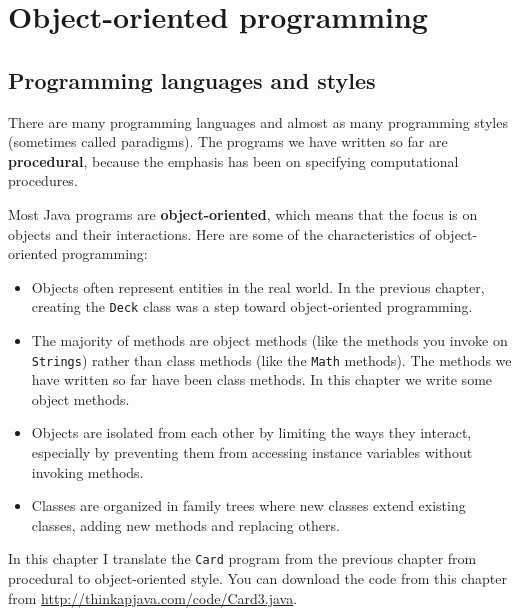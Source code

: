\chapter{Object-oriented programming}
\label{chap13}

\section{Programming languages and styles}

There are many programming languages and almost as many
programming styles (sometimes called paradigms).
The programs we have written so far are {\bf procedural},
because the emphasis has been on specifying computational procedures.

Most Java programs are {\bf object-oriented}, which means that
the focus is on objects and their interactions.
Here are some of the characteristics of object-oriented programming:

\begin{itemize}

\item Objects often represent entities in the real world.
  In the previous chapter, creating the {\tt Deck} class
  was a step toward object-oriented programming.

\item The majority of methods are object methods (like the methods you
  invoke on {\tt Strings}) rather than class methods (like the {\tt Math}
  methods).  The methods we have written so far have
  been class methods.  In this chapter we write some object methods.

\item Objects are isolated from each other by limiting the ways they
  interact, especially by preventing them from accessing
  instance variables without invoking methods.

\item Classes are organized in family trees where
  new classes extend existing classes, adding new methods and
  replacing others.

\end{itemize}

In this chapter I translate the {\tt Card} program from the
previous chapter from procedural to object-oriented style.  You
can download the code from this chapter from
\url{http://thinkapjava.com/code/Card3.java}.


